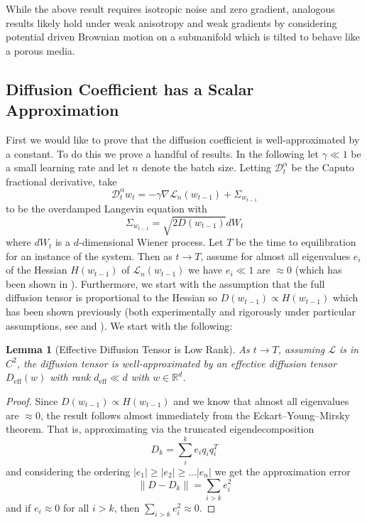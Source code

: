 \documentclass{article} %
\newtheorem{lemma}{Lemma}[section]
\theoremstyle{definition}
\begin{document}
While the above result requires isotropic noise and zero gradient, analogous results likely hold under weak anisotropy and weak gradients by considering potential driven Brownian motion on a submanifold which is tilted to behave like a porous media.

\subsection{Diffusion Coefficient has a Scalar Approximation}
First we would like to prove that the diffusion coefficient is well-approximated by a constant. To do this we prove a handful of results. In the following let $\gamma \ll 1$ be a small learning rate and let $n$ denote the batch size. Letting $\mathcal{D}^\alpha_t$ be the Caputo fractional derivative, take 
    \begin{equation}
    \mathcal{D}^\alpha_tw_t = -\gamma\nabla \mathcal{L}_n(w_{t-1}) + \Sigma_{w_{t-1}}
\end{equation}
to be the overdamped Langevin equation with 
\begin{equation}
    \Sigma_{w_{t-1}} = \sqrt{2D(w_{t-1})} dW_t
\end{equation}
where $dW_t$ is a $d$-dimensional Wiener process. Let $T$ be the time to equilibration for an instance of the system. Then as $t \to T$, assume for almost all eigenvalues $e_i$ of the Hessian $H(w_{t-1})$ of $\mathcal{L}_n(w_{t-1})$ we have $e_i \ll 1$ are $\approx 0$ (which has been shown in \citep{Sagun2016Eigenvalues}). Furthermore, we start with the assumption that the full diffusion tensor is proportional to the Hessian so $D(w_{t-1}) \propto H(w_{t-1})$ which has been shown previously (both experimentally and rigorously under particular assumptions, see \citep{xie2021diffusiontheorydeeplearning} and \citep{smith2018bayesianperspectivegeneralizationstochastic}). We start with the following:
\begin{lemma}[Effective Diffusion Tensor is Low Rank]
     As $t \to T$, assuming $\mathcal{L}$ is in $C^2$, the diffusion tensor is well-approximated by an effective diffusion tensor $D_{\text{eff}}(w)$ with rank $d_\text{eff} \ll d$ with $w \in \mathbb{R}^d$.
\end{lemma}
\begin{proof}
     Since $D(w_{t-1}) \propto H(w_{t-1})$ and we know that almost all eigenvalues are $\approx 0$, the result follows almost immediately from the Eckart–Young–Mirsky theorem. That is, approximating via the truncated eigendecomposition
     \begin{equation}
         D_{k} = \sum^k_i e_i q_i q_i^T
     \end{equation}
     and considering the ordering $|e_1| \geq |e_2| \geq ... |e_n|$ we get the approximation error
     \begin{equation}
         \|D - D_k\| = \sum_{i>k} e_i^2
     \end{equation}
     and if $e_i \approx 0$ for all $i>k$, then $\sum_{i>k} e_i^2 \approx 0$.
\end{proof}
\end{document}
